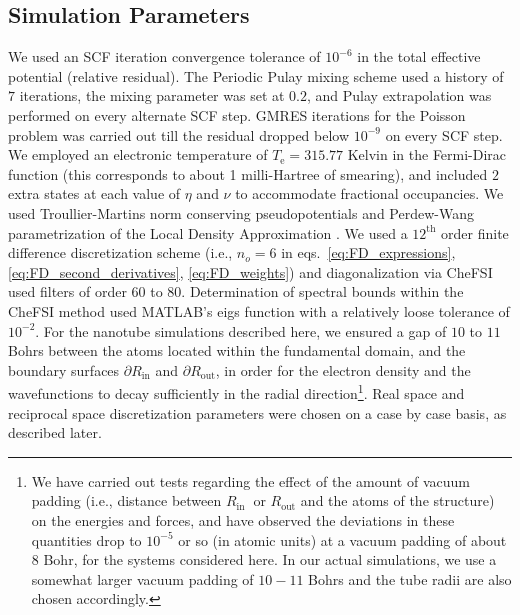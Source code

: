 \documentclass[preprint,12pt, 3p, sort&compress]{elsarticle}
\begin{document}
\subsection{Simulation Parameters}
\label{subsec:Sim_Params}
We used an SCF iteration convergence tolerance of $10^{-6}$ in the total effective potential (relative residual). The Periodic Pulay mixing scheme \citep{banerjee2016periodic} used a history of $7$ iterations, the mixing parameter was set at $0.2$, and Pulay extrapolation was performed on every alternate SCF step. GMRES iterations for the Poisson problem was carried out till the residual dropped below $10^{-9}$ on every SCF step. We employed an electronic temperature of $T_{\text{e}} = 315.77$ Kelvin in the Fermi-Dirac function (this corresponds to about 1 milli-Hartree of smearing), and included $2$ extra states at each value of $\eta$ and $\nu$ to accommodate fractional occupancies.  We used Troullier-Martins norm conserving pseudopotentials \citep{troullier1991efficient} and Perdew-Wang parametrization \citep{Perdew_Wang} of the Local Density Approximation \citep{KohnSham_DFT}. We used a $12^{\text{th}}$ order finite difference discretization scheme (i.e., $n_o = 6$ in eqs.~\ref{eq:FD_expressions}, \ref{eq:FD_second_derivatives}, \ref{eq:FD_weights}) and diagonalization via CheFSI used filters of order $60$ to $80$. Determination of spectral bounds within the CheFSI method used MATLAB's \textsf{eigs} function \citep{stewart2002krylov} with a relatively loose tolerance of $10^{-2}$. For the nanotube simulations described here, we ensured a gap of $10$ to $11$ Bohrs between the atoms located within the fundamental domain, and the boundary surfaces $\partial R_{\text{in}}$ and $\partial R_{\text{out}}$, in order for the electron density and the wavefunctions to decay sufficiently in the radial direction\footnote{{We have carried out tests regarding the effect of the amount of vacuum padding (i.e., distance between $R_{\text {in }}$ or $R_{\text {out}}$ and the atoms of the structure) on the energies and forces,  and have observed the deviations in these quantities drop to $10^{-5}$ or so (in atomic units) at a vacuum padding of about $8$ Bohr, for the systems considered here. In our actual simulations, we use a somewhat larger vacuum  padding of $10-11$ Bohrs and the tube radii are also chosen accordingly.}}. Real space and reciprocal space discretization parameters were chosen on a case by case basis, as described later. 
\end{document}
